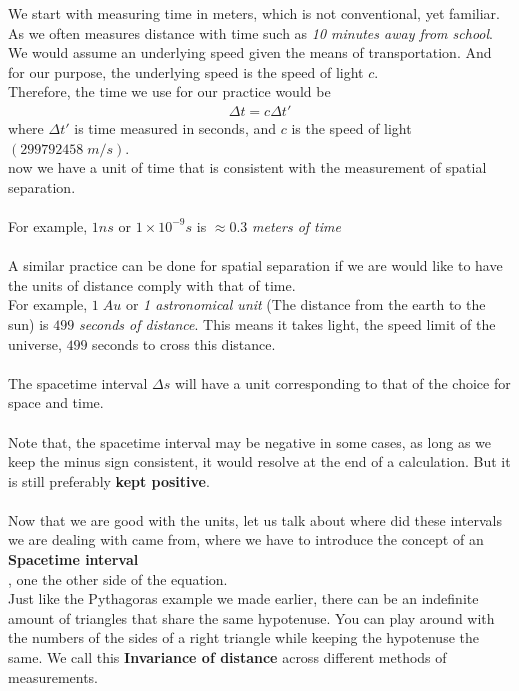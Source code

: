 \documentclass[11pt,letterpaper]{book}
\begin{document}
We start with measuring time in meters, which is not conventional, yet familiar. As we often measures distance with time such as \textit{10 minutes away from school}. We would assume an underlying speed given the means of transportation. And for our purpose, the underlying speed is the speed of light $c$.\\
Therefore, the time we use for our practice would be 
\begin{align}
\Delta t = c\Delta t' 
\end{align}
where $\Delta t'$ is time measured in seconds, and $c$ is the speed of light $(299792458\;m/s)$.\\
now we have a unit of time that is consistent with the measurement of spatial separation.\\
\\For example, $1ns$ or $1\times 10^{-9}s$ is $\approx 0.3$ \textit{meters of time}\\
\\A similar practice can be done for spatial separation if we are would like to have the units of distance comply with that of time.\\

For example, $1\; Au$ or \textit{1 astronomical unit} (The distance from the earth to the sun) is $499$ \textit{seconds of distance}. This means it takes light, the speed limit of the universe, $499$ seconds to cross this distance. 
\\
\\
The spacetime interval $\Delta s$ will have a unit corresponding to that of the choice for space and time.
\\\\
Note that, the spacetime interval may be negative in some cases, as long as we keep the minus sign consistent, it would resolve at the end of a calculation. But it is still preferably \textbf{kept positive}.\\
\\
Now that we are good with the units, let us talk about where did these intervals we are dealing with came from, where we have to introduce the concept of an \textbf{Spacetime interval}\\, one the other side of the equation.
\\

Just like the Pythagoras example we made earlier, there can be an indefinite amount of triangles that share the same hypotenuse. You can play around with the numbers of the sides of a right triangle while keeping the hypotenuse the same. We call this \textbf{Invariance of distance} across different methods of measurements. \\
\end{document}
